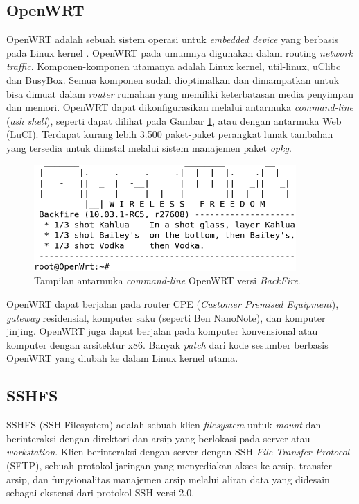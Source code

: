   \subsection{OpenWRT}
    OpenWRT adalah sebuah sistem operasi untuk \emph{embedded device} yang berbasis pada Linux kernel \cite{OpenWrtProject2013}. OpenWRT pada umumnya digunakan dalam routing \emph{network traffic}. Komponen-komponen utamanya adalah Linux kernel, util-linux, uClibc dan BusyBox. Semua komponen sudah dioptimalkan dan dimampatkan untuk bisa dimuat dalam \emph{router} rumahan yang memiliki keterbatasan media penyimpan dan memori. OpenWRT dapat dikonfigurasikan melalui antarmuka \emph{command-line} (\emph{ash shell}), seperti dapat dilihat pada Gambar \ref{openwrt}, atau dengan antarmuka Web (LuCI). Terdapat kurang lebih 3.500 paket-paket perangkat lunak tambahan yang tersedia untuk diinstal melalui sistem manajemen paket \emph{opkg}.

      \begin{figure}[ht!]
        \centering
          \includegraphics[width=10cm]{gambar/openwrt}
          \caption{Tampilan antarmuka \emph{command-line} OpenWRT versi \emph{BackFire}.}
          \label{openwrt}
      \end{figure}

    OpenWRT dapat berjalan pada router CPE (\emph{Customer Premised Equipment}), \emph{gateway} residensial, komputer saku (seperti Ben NanoNote), dan komputer jinjing. OpenWRT juga dapat berjalan pada komputer konvensional atau komputer dengan arsitektur x86. Banyak \emph{patch} dari kode sesumber berbasis OpenWRT yang diubah ke dalam Linux kernel utama.

  \subsection{SSHFS}
    SSHFS (SSH Filesystem) adalah sebuah klien \emph{filesystem} untuk \emph{mount} dan berinteraksi dengan direktori dan arsip yang berlokasi pada server atau \emph{workstation}. Klien berinteraksi dengan server dengan SSH \emph{File Transfer Protocol} (SFTP), sebuah protokol jaringan yang menyediakan akses ke arsip, transfer arsip, dan fungsionalitas manajemen arsip melalui aliran data yang didesain sebagai ekstensi dari protokol SSH versi 2.0.

